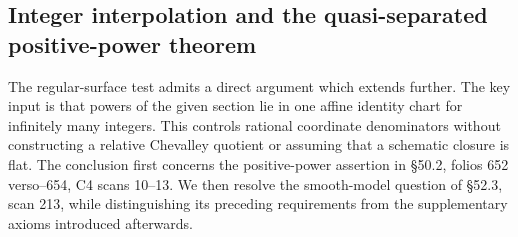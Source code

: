 \subsection{Integer interpolation and the quasi-separated positive-power theorem}

The regular-surface test admits a direct argument which extends further.
The key input is that powers of the given section lie in one affine
identity chart for infinitely many integers. This controls rational
coordinate denominators without constructing a relative Chevalley
quotient or assuming that a schematic closure is flat. The conclusion
first concerns the positive-power assertion in \S50.2, folios
652 verso--654, C4 scans 10--13. We then resolve the smooth-model
question of \S52.3, scan 213, while distinguishing its preceding
requirements from the supplementary axioms introduced afterwards.

